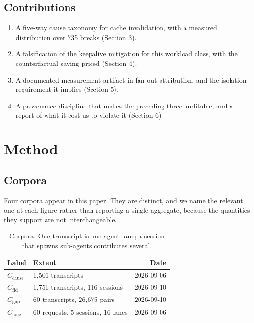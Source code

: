 \documentclass[11pt,twocolumn,letterpaper]{article}
\begin{document}
\subsection{Contributions}

\begin{enumerate}
  \item A five-way cause taxonomy for cache invalidation, with a measured
    distribution over 735 breaks (Section 3).
  \item A falsification of the keepalive mitigation for this workload class,
    with the counterfactual saving priced (Section 4).
  \item A documented measurement artifact in fan-out attribution, and the
    isolation requirement it implies (Section 5).
  \item A provenance discipline that makes the preceding three auditable, and
    a report of what it cost us to violate it (Section 6).
\end{enumerate}

\section{Method}

\subsection{Corpora}

Four corpora appear in this paper. They are distinct, and we name the relevant
one at each figure rather than reporting a single aggregate, because the
quantities they support are not interchangeable.

\begin{table}[h]
\centering
\caption{Corpora. One transcript is one agent lane; a session that spawns
sub-agents contributes several.}
\label{tab:corpora}
\vskip 0.1in
\small
\begin{tabular}{llr}
\toprule
\textbf{Label} & \textbf{Extent} & \textbf{Date} \\
\midrule
$C_{\text{cause}}$ & 1{,}506 transcripts & 2026-09-06 \\
$C_{\text{fid}}$   & 1{,}751 transcripts, 116 sessions & 2026-09-10 \\
$C_{\text{gap}}$   & 60 transcripts, 26{,}675 pairs & 2026-09-10 \\
$C_{\text{lane}}$  & 60 requests, 5 sessions, 16 lanes & 2026-09-06 \\
\bottomrule
\end{tabular}
\end{table}
\end{document}
